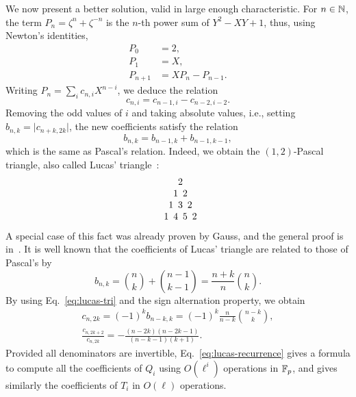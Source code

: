 \documentclass{sig-alternate}
\begin{document}
We now present a better solution, valid in large enough
characteristic. For $n \in \mathbb{N}$, the term $P_{n}=\zeta^{n} +
\zeta^{-n}$ is the $n$-th power sum of $Y^2-XY+1$, thus, using
Newton's identities,
\begin{equation}
  \label{eq:simple}
  \begin{aligned}
    P_0 &= 2,\\
    P_1 &= X,\\
    P_{n+1} &= X P_{n} - P_{n-1}.
  \end{aligned}
\end{equation}
Writing $P_n = \sum_i c_{n,i}X^{n-i}$, we deduce the relation
\begin{equation}
  c_{n,i} = c_{n-1,i} - c_{n-2,i-2}.
\end{equation}
Removing the odd values of $i$ and taking absolute values, i.e.,
setting $b_{n,k}=\lvert c_{n+k,2k}\rvert$, the new coefficients
satisfy the relation
\begin{equation*}
  b_{n,k} = b_{n-1,k} + b_{n-1,k-1},
\end{equation*}
which is the same as Pascal's relation. Indeed, we obtain the
$(1,2)$-Pascal triangle, also called Lucas'
triangle~\cite{benjamin10}:
\begin{equation*}
  \begin{tabular}{*{8}{c@{}}}
    &&&2\\
    &&1&&2\\
    &1&&3&&2\\
    1&&4&&5&&2
  \end{tabular}
\end{equation*}
A special case of this fact was already proven by Gauss, and the
general proof is in~\cite[Prop.~1]{gurak06}. It is well known that
the coefficients of Lucas' triangle are related to those of Pascal's
by
\begin{equation}
  \label{eq:lucas-tri}
  b_{n,k} = \binom{n}{k} + \binom{n-1}{k-1} = \frac{n+k}{n}\binom{n}{k}.
\end{equation}
By using Eq.~\eqref{eq:lucas-tri} and the sign alternation property,
we obtain 
\begin{gather}
  c_{n,2k} = (-1)^kb_{n-k,k} = (-1)^k\frac{n}{n-k}\binom{n-k}{k},\\
  \label{eq:lucas-recurrence}
  \frac{c_{n,2k+2}}{c_{n,2k}} = 
  -\frac{(n-2k)(n-2k-1)}{(n-k-1)(k+1)}.
\end{gather}
Provided all denominators are invertible,
Eq.~\eqref{eq:lucas-recurrence} gives a formula to compute all the
coefficients of $Q_{i}$ using $O(\ell^{i})$ operations in $\mathbb{F}_p$, and
gives similarly the coefficients of $T_i$ in $O(\ell)$ operations.
\end{document}

